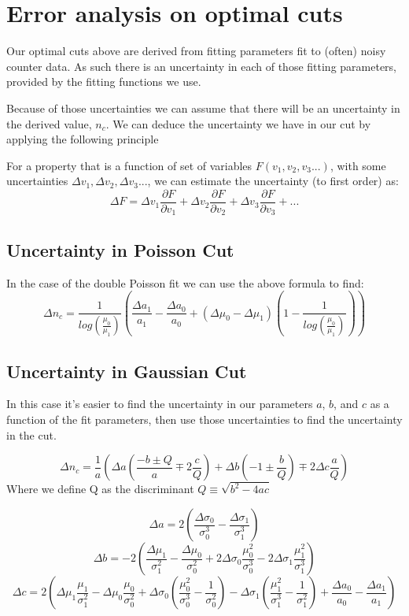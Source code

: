\documentclass{article}
\begin{document}
\section{Error analysis on optimal cuts}
Our optimal cuts above are derived from fitting parameters fit to (often) noisy counter data. As such there is an uncertainty in each of those fitting parameters, provided by the fitting functions we use.

Because of those uncertainties we can assume that there will be an uncertainty in the derived value, $n_c$. We can deduce the uncertainty we have in our cut by applying the following principle

For a property that is a function of set of variables $F(v_1,v_2,v_3...)$, with some uncertainties $\Delta v_1, \Delta v_2, \Delta v_3 ...$, we can estimate the uncertainty (to first order) as:
\[ \Delta F = \Delta v_1 \frac{\partial F}{\partial v_1} + \Delta v_2 \frac{\partial F}{\partial v_2} + \Delta v_3 \frac{\partial F}{\partial v_3} + ...\]

\subsection{Uncertainty in Poisson Cut}

In the case of the double Poisson fit we can use the above formula to find:
\[ \Delta n_c = \frac{1}{log\left(\frac{\mu_0}{\mu_1}\right)} \left(\frac{\Delta a_1}{a_1} - \frac{\Delta a_0}{a_0} + (\Delta\mu_0-\Delta\mu_1)\left(1-\frac{1}{log\left(\frac{\mu_0}{\mu_1}\right)}\right)\right)\]

\subsection{Uncertainty in Gaussian Cut}

In this case it's easier to find the uncertainty in our parameters $a$, $b$, and $c$ as a function of the fit parameters, then use those uncertainties to find the uncertainty in the cut.

\[\Delta n_c = \frac{1}{a}\left(\Delta a \left(\frac{-b\pm Q}{a}\mp 2\frac{c}{Q}\right) +\Delta b \left(-1\pm \frac{b}{Q}\right) \mp 2\Delta c \frac{a}{Q}\right)\]
Where we define Q as the discriminant
$Q \equiv \sqrt{b^2-4ac}$

\[\Delta a = 2\left(\frac{\Delta\sigma_0}{\sigma_0^3}-\frac{\Delta\sigma_1}{\sigma_1^3}\right)\]
\[\Delta b = -2\left(\frac{\Delta\mu_1}{\sigma_1^2}-\frac{\Delta\mu_0}{\sigma_0^2}+2\Delta \sigma_0\frac{\mu_0^2}{\sigma_0^3}-2\Delta \sigma_1\frac{\mu_1^2}{\sigma_1^3}\right)\]
\[ \Delta c = 2\left(\Delta \mu_1 \frac{\mu_1}{\sigma_1^2}-\Delta \mu_0 \frac{\mu_0}{\sigma_0^2}+\Delta \sigma_0\left(\frac{\mu_0^2}{\sigma_0^3}-\frac{1}{\sigma_0^2} \right) - \Delta \sigma_1\left(\frac{\mu_1^2}{\sigma_1^3}-\frac{1}{\sigma_1^2} \right) + \frac{\Delta a_0}{a_0}- \frac{\Delta a_1}{a_1}\right)\]
\end{document}
